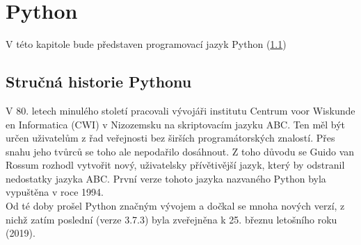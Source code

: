 \documentclass[a4paper, 12pt]{article}
\begin{document}
\section{Python}
V této kapitole bude představen programovací jazyk Python (\ref{sec:history})
\subsection{Stručná historie Pythonu} \label{sec:history}
V 80. letech minulého století pracovali vývojáři institutu Centrum voor Wiskunde en Informatica (CWI) v Nizozemsku na skriptovacím jazyku ABC.  Ten měl být určen uživatelům z řad veřejnosti bez širších programátorských znalostí. \cite{PythonHist:1} Přes snahu jeho tvůrců se toho ale nepodařilo dosáhnout. Z toho důvodu se Guido van Rossum rozhodl vytvořit nový, uživatelsky přívětivější jazyk, který by odstranil nedostatky jazyka ABC. První verze tohoto jazyka nazvaného Python byla vypuštěna v roce 1994. \cite{PythonHist:2}
\\
\noindent
Od té doby prošel Python značným vývojem a dočkal se mnoha nových verzí, z nichž zatím poslední (verze 3.7.3) byla zveřejněna k 25. březnu letošního roku (2019). \cite{PythonVersion}
\end{document}
